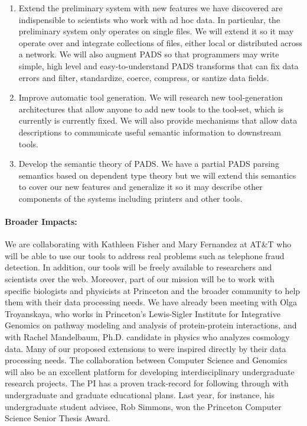 \begin{enumerate}
\item Extend the preliminary system with new features we have discovered are indispensible to
scientists who work with ad hoc data.  In particular, the preliminary system only operates
on single files.  We will extend it so it may operate over and integrate collections of files,
either local or distributed across a network.  We will also augment PADS so that
programmers may write simple, high level and easy-to-understand PADS transforms that can fix data errors
and filter, standardize, coerce, compress, or santize data fields.
\item  Improve automatic tool generation.  We will research new tool-generation architectures
that allow anyone to add new tools to the tool-set, which is currently is currently fixed.
We will also provide mechanisms that allow data descriptions to communicate useful semantic information
to downstream tools.
\item Develop the semantic theory of PADS.  We have a partial PADS parsing semantics based on dependent type
theory but we will extend this semantics to cover our new features and generalize it so it may
describe other components of the systems including printers and other tools.
\end{enumerate}

\paragraph*{Broader Impacts:}  We are collaborating with Kathleen Fisher
and Mary Fernandez at
AT\&T who will be able to use our tools to address real problems such
as telephone fraud detection.  In addition, our tools will be freely
available to researchers and scientists over the web.  Moreover, part
of our mission will be to work with specific biologists and
physicists at Princeton and the broader community to help them with
their data processing needs.  We have already been meeting with Olga
Troyanskaya, who works in Princeton's Lewis-Sigler Institute for
Integrative Genomics on pathway modeling and analysis of
protein-protein interactions, and with Rachel Mandelbaum, Ph.D. candidate
in physics who analyzes cosmology data.  Many of our proposed extensions to
\pads{} were inspired directly by their data processing needs.  
The collaboration between Computer Science and Genomics will also be an
excellent platform for developing interdisciplinary undergraduate
research projects.  The PI has a proven track-record 
for following through with undergraduate and graduate
educational plans.  Last year, for instance, his undergraduate student advisee, Rob Simmons,
won the Princeton Computer Science Senior Thesis Award.

